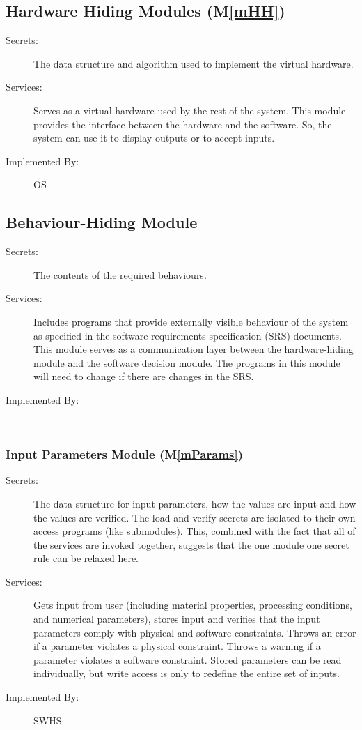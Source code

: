 \documentclass[12pt]{article}
\newcommand{\mref}[1]{M\ref{#1}}
\begin{document}
\subsection{Hardware Hiding Modules (\mref{mHH})}

\begin{description}
\item[Secrets:] The data structure and algorithm used to implement the virtual
  hardware.
\item[Services:] Serves as a virtual hardware used by the rest of the
  system. This module provides the interface between the hardware and the
  software. So, the system can use it to display outputs or to accept inputs.
\item[Implemented By:] OS
\end{description}

\subsection{Behaviour-Hiding Module}

\begin{description}
\item[Secrets:] The contents of the required behaviours.
\item[Services:] Includes programs that provide externally visible behaviour of
  the system as specified in the software requirements specification (SRS)
  documents. This module serves as a communication layer between the
  hardware-hiding module and the software decision module. The programs in this
  module will need to change if there are changes in the SRS.
\item[Implemented By:] --
\end{description}

\subsubsection{Input Parameters Module (\mref{mParams})}

\begin{description}
\item[Secrets:] The data structure for input parameters, how the
values are input and how the values are verified.  The load and verify secrets
are isolated to their own access programs (like submodules).  This, combined
with the fact that all of the services are invoked together, suggests that the
one module one secret rule can be relaxed here.
\item[Services:] Gets input from user (including material properties, processing
  conditions, and numerical parameters), stores input and verifies that the
  input parameters comply with physical and software constraints. Throws an
  error if a parameter violates a physical constraint. Throws a warning if a
  parameter violates a software constraint.  Stored parameters can be read
  individually, but write access is only to redefine the entire set of inputs.
\item[Implemented By:] SWHS
\end{description}
\end{document}

